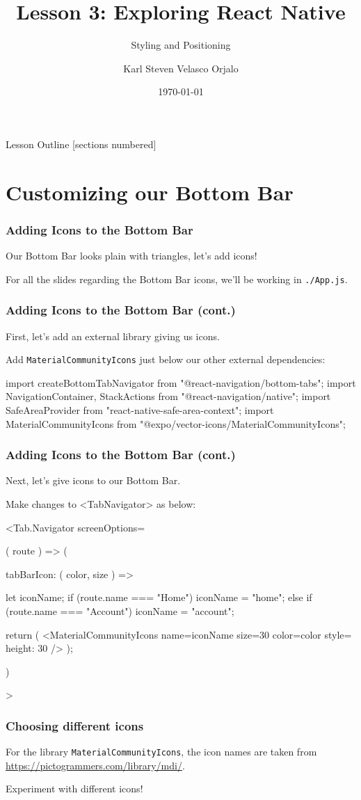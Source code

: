 \documentclass{beamer}
\title{Lesson 3: Exploring React Native}
\subtitle{Styling and Positioning}
\date{\today}
\author{Karl Steven Velasco Orjalo}
\institute{React Native Quickstart}
\begin{document}
  \maketitle

  \begin{frame}{Lesson Outline}
    [sections numbered]
    \tableofcontents
  \end{frame}

  \section{Customizing our Bottom Bar}
  \begin{frame}[fragile]
    \frametitle{Adding Icons to the Bottom Bar}
    Our Bottom Bar looks plain with triangles, let's add icons!

    For all the slides regarding the Bottom Bar icons, we'll be working in \verb|./App.js|.
  \end{frame}
  \begin{frame}[fragile]
    \frametitle{Adding Icons to the Bottom Bar (cont.)}
    First, let's add an external library giving us icons. 

    Add \verb|MaterialCommunityIcons| just below our other external dependencies: 

    \begin{jscode}
import { createBottomTabNavigator } from "@react-navigation/bottom-tabs";
import { NavigationContainer, StackActions } from "@react-navigation/native";
import { SafeAreaProvider } from "react-native-safe-area-context";
import MaterialCommunityIcons from "@expo/vector-icons/MaterialCommunityIcons";
    \end{jscode}
  \end{frame}
  \begin{frame}[fragile]
    \frametitle{Adding Icons to the Bottom Bar (cont.)}
    Next, let's give icons to our Bottom Bar.

    Make changes to <TabNavigator> as below:

    \begin{jscodesmall}
  <Tab.Navigator
    screenOptions={({ route }) => ({
      tabBarIcon: ({ color, size }) => {
        let iconName;
        if (route.name === "Home") {
          iconName = "home";
        } else if (route.name === "Account") {
          iconName = "account";
        }

        return (
          <MaterialCommunityIcons
            name={iconName}
            size={30}
            color={color}
            style={{ height: 30 }}
          />                              
        );
      }
    })}
  >
    \end{jscodesmall}
  \end{frame}
  \begin{frame}[fragile]
    \frametitle{Choosing different icons}
    For the library \verb|MaterialCommunityIcons|, the icon names are taken from \url{https://pictogrammers.com/library/mdi/}.

    \vspace{0.5cm}
    Experiment with different icons!
  \end{frame}
\end{document}

